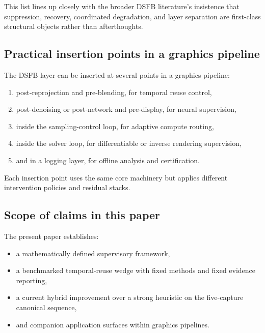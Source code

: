 \documentclass[11pt]{article}
\theoremstyle{definition}
\theoremstyle{plain}
\begin{document}
This list lines up closely with the broader DSFB literature’s insistence that suppression, recovery, coordinated degradation, and layer separation are first-class structural objects rather than afterthoughts. 


\subsection{Practical insertion points in a graphics pipeline}

The DSFB layer can be inserted at several points in a graphics pipeline:
\begin{enumerate}[leftmargin=1.5em]
    \item post-reprojection and pre-blending, for temporal reuse control,
    \item post-denoising or post-network and pre-display, for neural supervision,
    \item inside the sampling-control loop, for adaptive compute routing,
    \item inside the solver loop, for differentiable or inverse rendering supervision,
    \item and in a logging layer, for offline analysis and certification.
\end{enumerate}

Each insertion point uses the same core machinery but applies different intervention policies and residual stacks.


\subsection{Scope of claims in this paper}

The present paper establishes:
\begin{itemize}[leftmargin=1.5em]
    \item a mathematically defined supervisory framework,
    \item a benchmarked temporal-reuse wedge with fixed methods and fixed evidence reporting,
    \item a current hybrid improvement over a strong heuristic on the five-capture canonical sequence,
    \item and companion application surfaces within graphics pipelines.
\end{itemize}
\end{document}
